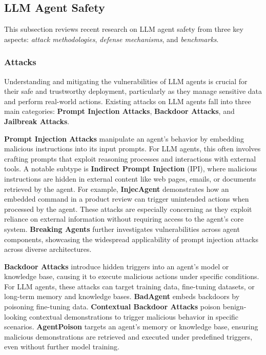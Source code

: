 \subsection{LLM Agent Safety}
\label{sec:agent_LLM}

This subsection reviews recent research on LLM agent safety from three key aspects: \emph{attack methodologies}, \emph{defense mechanisms}, and \emph{benchmarks}.

\subsubsection{Attacks}
Understanding and mitigating the vulnerabilities of LLM agents is crucial for their safe and trustworthy deployment, particularly as they manage sensitive data and perform real-world actions. Existing attacks on LLM agents fall into three main categories: \textbf{Prompt Injection Attacks}, \textbf{Backdoor Attacks}, and \textbf{Jailbreak Attacks}.

\textbf{Prompt Injection Attacks} manipulate an agent's behavior by embedding malicious instructions into its input prompts. For LLM agents, this often involves crafting prompts that exploit reasoning processes and interactions with external tools. A notable subtype is \textbf{Indirect Prompt Injection} (IPI), where malicious instructions are hidden in external content like web pages, emails, or documents retrieved by the agent. For example, \textbf{InjecAgent} \cite{zhan2024injecagent} demonstrates how an embedded command in a product review can trigger unintended actions when processed by the agent. These attacks are especially concerning as they exploit reliance on external information without requiring access to the agent's core system. \textbf{Breaking Agents} \cite{zhang2024breaking} further investigates vulnerabilities across agent components, showcasing the widespread applicability of prompt injection attacks across diverse architectures.

\textbf{Backdoor Attacks} introduce hidden triggers into an agent's model or knowledge base, causing it to execute malicious actions under specific conditions. For LLM agents, these attacks can target training data, fine-tuning datasets, or long-term memory and knowledge bases. \textbf{BadAgent} \cite{wang2024badagent} embeds backdoors by poisoning fine-tuning data. \textbf{Contextual Backdoor Attacks} \cite{liu2024compromising} poison benign-looking contextual demonstrations to trigger malicious behavior in specific scenarios. \textbf{AgentPoison} \cite{chen2024agentpoison} targets an agent's memory or knowledge base, ensuring malicious demonstrations are retrieved and executed under predefined triggers, even without further model training.

